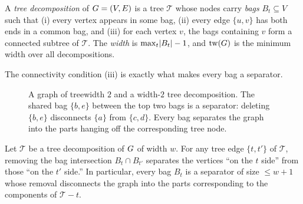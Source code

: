 \begin{definition}\label{ch27:def-td}
A \emph{tree decomposition} of $G=(V,E)$ is a tree $\mathcal T$ whose nodes carry \emph{bags} $B_t\subseteq V$ such that (i) every vertex appears in some bag, (ii) every edge $\{u,v\}$ has both ends in a common bag, and (iii) for each vertex $v$, the bags containing $v$ form a connected subtree of $\mathcal T$. The \emph{width} is $\max_t\lvert B_t\rvert-1$, and $\operatorname{tw}(G)$ is the minimum width over all decompositions.
\end{definition}

The connectivity condition (iii) is exactly what makes every bag a separator.

\begin{figure}[H]
\centering
{}
\caption{A graph of treewidth $2$ and a width-$2$ tree decomposition. The shared bag $\{b,e\}$ between the top two bags is a separator: deleting $\{b,e\}$ disconnects $\{a\}$ from $\{c,d\}$. Every bag separates the graph into the parts hanging off the corresponding tree node.}
\label{ch27:fig-td}
\end{figure}

\begin{theorem}\label{ch27:thm-bagsep}
Let $\mathcal T$ be a tree decomposition of $G$ of width $w$. For any tree edge $\{t,t'\}$ of $\mathcal T$, removing the bag intersection $B_t\cap B_{t'}$ separates the vertices ``on the $t$ side'' from those ``on the $t'$ side.'' In particular, every bag $B_t$ is a separator of size $\le w+1$ whose removal disconnects the graph into the parts corresponding to the components of $\mathcal T-t$.
\end{theorem}

